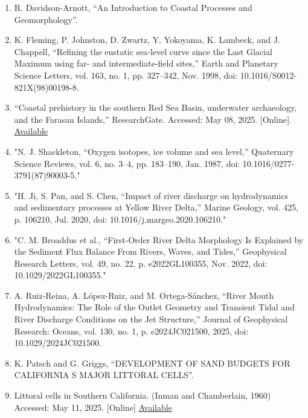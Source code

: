 \documentclass{article}
\begin{document}
{\begin{enumerate}
    \item {R. Davidson-Arnott, “An Introduction to Coastal Processes and Geomorphology”.}

    \item {K. Fleming, P. Johnston, D. Zwartz, Y. Yokoyama, K. Lambeck, and J. Chappell, “Refining the eustatic sea-level curve since the Last Glacial Maximum using far- and intermediate-field sites,” Earth and Planetary Science Letters, vol. 163, no. 1, pp. 327–342, Nov. 1998, doi: 10.1016/S0012-821X(98)00198-8.}

    \item {“Coastal prehistory in the southern Red Sea Basin, underwater archaeology, and the Farasan Islands,” ResearchGate. Accessed: May 08, 2025. [Online]. \href{https://www.researchgate.net/publication/277182725_Coastal_prehistory_in_the_southern_Red_Sea_Basin_underwater_archaeology_and_the_Farasan_Islands}{Available}}

    \item {"N. J. Shackleton, “Oxygen isotopes, ice volume and sea level,” Quaternary Science Reviews, vol. 6, no. 3–4, pp. 183–190, Jan. 1987, doi: 10.1016/0277-3791(87)90003-5."}

    \item {"H. Ji, S. Pan, and S. Chen, “Impact of river discharge on hydrodynamics and sedimentary processes at Yellow River Delta,” Marine Geology, vol. 425, p. 106210, Jul. 2020, doi: 10.1016/j.margeo.2020.106210."}

    \item{"C. M. Broaddus et al., “First‐Order River Delta Morphology Is Explained by the Sediment Flux Balance From Rivers, Waves, and Tides,” Geophysical Research Letters, vol. 49, no. 22, p. e2022GL100355, Nov. 2022, doi: 10.1029/2022GL100355."}

    \item{A. Ruiz-Reina, A. López-Ruiz, and M. Ortega-Sánchez, “River Mouth Hydrodynamics: The Role of the Outlet Geometry and Transient Tidal and River Discharge Conditions on the Jet Structure,” Journal of Geophysical Research: Oceans, vol. 130, no. 1, p. e2024JC021500, 2025, doi: 10.1029/2024JC021500.}

    \item{K. Patsch and G. Griggs, “DEVELOPMENT OF SAND BUDGETS FOR CALIFORNIA S MAJOR LITTORAL CELLS”.}

    \item{Littoral cells in Southern California. (Inman and Chamberlain, 1960) Accessed: May 11, 2025. [Online] \href{https://www.researchgate.net/figure/Littoral-cells-in-Southern-California-Inman-and-Chamberlain-1960-Thurman-and_fig4_240635473}{Available}}


\end{enumerate}}
\end{document}
